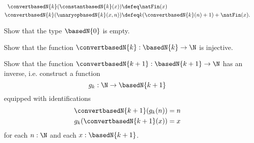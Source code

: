 \begin{exercises}
\begin{align*}
    \convertbasedN{k}(\constantbasedN{k}(x)) & \defeq \natFin(x) \\
    \convertbasedN{k}(\unaryopbasedN{k}(x,n)) & \defeq k(\convertbasedN{k}(n)+1)+\natFin(x).
  \end{align*}
  \begin{subexenum}
  \item Show that the type $\basedN{0}$ is empty.
  \item Show that the function $\convertbasedN{k}:\basedN{k}\to\N$ is injective.
  \item Show that the function $\convertbasedN{k+1}:\basedN{k+1}\to\N$ has an inverse, i.e. construct a function
    \begin{equation*}
      g_{k} : \N\to\basedN{k+1}
    \end{equation*}
    equipped with identifications
    \begin{align*}
      \convertbasedN{k+1}(g_k(n)) & = n \\
      g_{k}(\convertbasedN{k+1}(x)) & = x
    \end{align*}
    for each $n:\N$ and each $x:\basedN{k+1}$.
  \end{subexenum}
\end{exercises}
